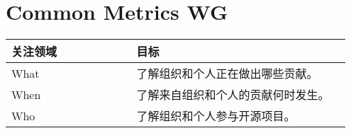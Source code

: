 

    \section{Common Metrics WG}
    \begin{table}[ht!]
        \centering
        \begin{tabular}{|p{0.35\linewidth} | p{0.6\linewidth}|}
            \hline
            \hfil \textbf{关注领域}  & \hfil \textbf{目标} \\
            \hline
        		What & 了解组织和个人正在做出哪些贡献。 \\ 
		\hline
		When & 了解来自组织和个人的贡献何时发生。 \\ 
		\hline
		Who & 了解组织和个人参与开源项目。 \\ 
		\hline
    \end{tabular}
    \end{table}
        
\clearpage
 
 
 

